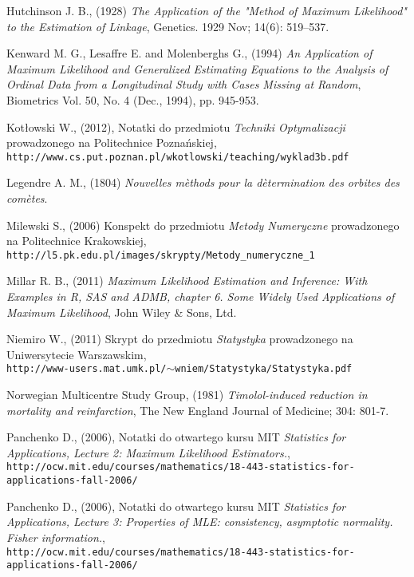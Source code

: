 \begin{thebibliography}{99}
 Hutchinson J. B., (1928) \textit{The Application of the "Method of Maximum Likelihood" to the Estimation of Linkage}, Genetics. 1929 Nov; 14(6): 519–537.


 Kenward M. G., Lesaffre E. and Molenberghs G., (1994) \textit{An Application of Maximum Likelihood and Generalized Estimating Equations to the Analysis of Ordinal Data from a Longitudinal Study with Cases Missing at Random}, Biometrics
Vol. 50, No. 4 (Dec., 1994), pp. 945-953.

 Kotłowski W., (2012), Notatki do przedmiotu \textit{Techniki Optymalizacji} prowadzonego na Politechnice Poznańskiej, \\ \texttt{http://www.cs.put.poznan.pl/wkotlowski/teaching/wyklad3b.pdf}

 Legendre A. M., (1804) \textit{Nouvelles m\`ethods pour la d\`etermination des orbites des com\`etes}.

 Milewski S., (2006) Konspekt do przedmiotu \textit{Metody Numeryczne} prowadzonego na Politechnice Krakowskiej, \\ \texttt{http://l5.pk.edu.pl/images/skrypty/Metody\_numeryczne\_1}

 Millar R. B., (2011) \textit{Maximum Likelihood Estimation and Inference: With Examples in R, SAS and ADMB, chapter 6. Some Widely Used Applications of Maximum Likelihood}, John Wiley \& Sons, Ltd.

 Niemiro W., (2011) Skrypt do przedmiotu \textit{Statystyka} prowadzonego na Uniwersytecie Warszawskim, \\ \texttt{http://www-users.mat.umk.pl/$\sim$wniem/Statystyka/Statystyka.pdf}

 Norwegian Multicentre Study Group, (1981) \textit{Timolol-induced reduction in
mortality and reinfarction}, The New England  Journal of Medicine; 304: 801-7.


 Panchenko D., (2006), Notatki do otwartego kursu MIT \textit{Statistics for Applications, Lecture 2: Maximum Likelihood Estimators.}, \\
\texttt{http://ocw.mit.edu/courses/mathematics/18-443-statistics-for-applications-fall-2006/}



 Panchenko D., (2006), Notatki do otwartego kursu MIT \textit{Statistics for Applications, Lecture 3: Properties of MLE: consistency, asymptotic normality. Fisher information.}, \\
\texttt{http://ocw.mit.edu/courses/mathematics/18-443-statistics-for-applications-fall-2006/}




\end{thebibliography}
